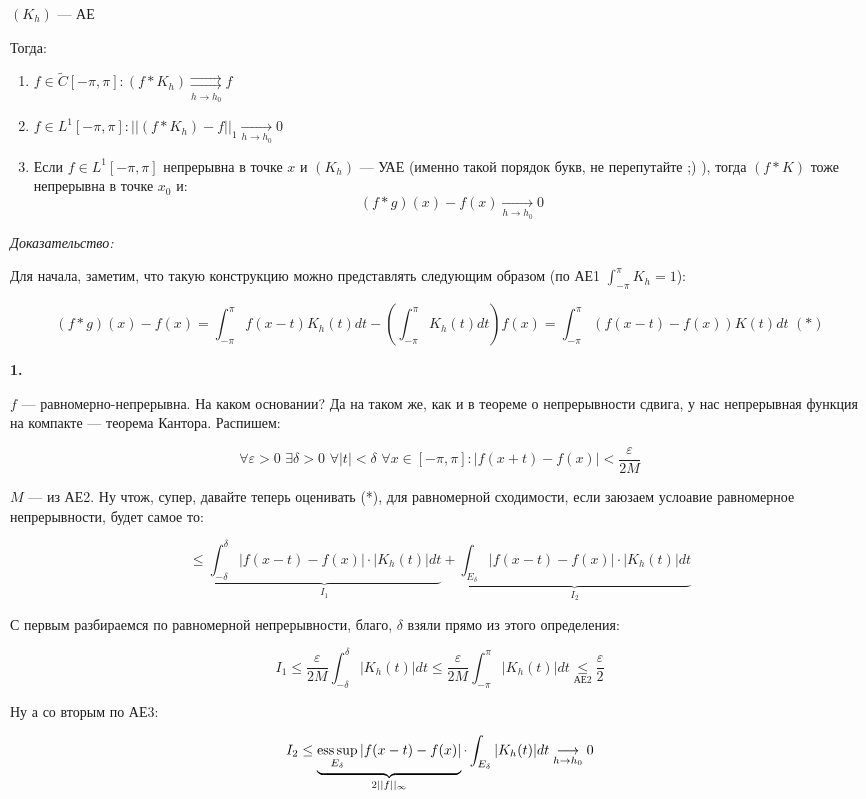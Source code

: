 \documentclass{article}
\def\dbl{\,\,}
\def\rsh#1{\underset{#1}{\rightrightarrows}}
\def\goesto#1{\underset{#1}{\longrightarrow}}
\begin{document}
$(K_h)$ --- АЕ

Тогда:

\begin{enumerate}
    \item $f \in \tilde{C}[-\pi, \pi]: (f * K_h) \rsh{h \rightarrow h_0} f$
    \item $f \in L^1[-\pi, \pi]: ||(f * K_h) - f||_1 \goesto{h \rightarrow h_0} 0$
    \item Если $f \in L^1[-\pi, \pi]$ непрерывна в точке $x$ и $(K_h)$ --- УАЕ (именно такой порядок букв, не перепутайте ;) ), тогда $(f * K)$ тоже непрерывна в точке $x_0$ и:
    \[(f * g)(x) - f(x) \goesto{h \rightarrow h_0} 0\]
\end{enumerate}

\textit{Доказательство:}

Для начала, заметим, что такую конструкцию можно представлять следующим образом (по АЕ1 $\int_{-\pi}^{\pi} K_h = 1$):

\[(f * g)(x) - f(x) = \int_{-\pi}^{\pi} f(x - t)K_h(t)dt - \left(\int_{-\pi}^{\pi} K_h(t) dt \right) f(x) = \int_{-\pi}^{\pi} (f(x - t) - f(x))K(t)dt \dbl (*)\]

\textbf{1.}

$f$ --- равномерно-непрерывна. На каком основании? Да на таком же, как и в теореме о непрерывности сдвига, у нас непрерывная функция на компакте --- теорема Кантора. Распишем:

\[\forall \varepsilon > 0 \dbl \exists \delta > 0 \dbl \forall |t| < \delta \dbl \forall x \in [-\pi, \pi] : |f(x + t) - f(x)| < \frac{\varepsilon}{2M}\]

$M$ --- из АЕ2. Ну чтож, супер, давайте теперь оценивать (*), для равномерной сходимости, если заюзаем услоавие равномерное непрерывности, будет самое то:

\[ \le \underbrace{\int_{-\delta}^{\delta} |f(x - t) - f(x)| \cdot |K_h(t)| dt}_{I_1} + \underbrace{\int_{E_\delta} |f(x - t) - f(x)| \cdot |K_h(t)| dt}_{I_2}\]

С первым разбираемся по равномерной непрерывности, благо, $\delta$ взяли прямо из этого определения:

\[ I_1 \le \frac{\varepsilon}{2M} \int_{-\delta}^{\delta} |K_h(t)|dt \le \frac{\varepsilon}{2M} \int_{-\pi}^{\pi} |K_h(t)| dt \underset{\text{АЕ2}}{\le} \frac{\varepsilon}{2}\]

Ну а со вторым по АЕ3:

\[I_2 \le \underbrace{\esssup_{E_\delta} |f(x - t) - f(x)|}_{2||f||_{\infty}} \cdot \int_{E_\delta} |K_h(t)| dt \goesto{h \rightarrow h_0} 0\]
\end{document}
